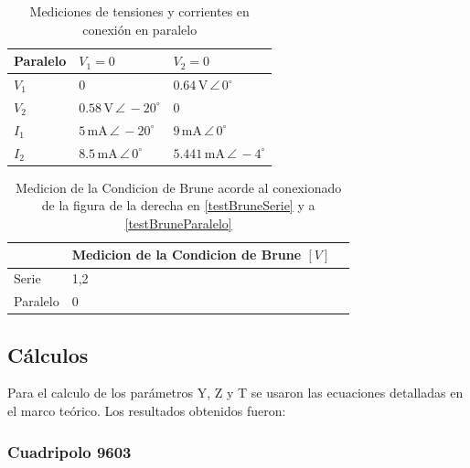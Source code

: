 \begin{table}[H]
\centering
\begin{tabular}{|l|l|l|}
\hline
\textbf{Paralelo} & $V_1 = 0$ & $V_2 = 0$ \\ \hline
$V_1$ & $0$ & $0.64\,\mathrm{V}\,\angle\,0^\circ$ \\ \hline
$V_2$ & $0.58\,\mathrm{V}\,\angle\,-20^\circ$ & $0$ \\ \hline
$I_1$ & $5\,\mathrm{mA}\,\angle\,-20^\circ$ & $9\,\mathrm{mA}\,\angle\,0^\circ$ \\ \hline
$I_2$ & $8.5\,\mathrm{mA}\,\angle\,0^\circ$ & $5.441\,\mathrm{mA}\,\angle\,-4^\circ$ \\ \hline
\end{tabular}
\caption{Mediciones de tensiones y corrientes en conexión en paralelo}
\label{tab:corrientes_tensiones_paralelo}
\end{table}



\begin{table}[H]
\centering
\begin{tabular}{|l|l|l|}
\hline
               & Medicion de la Condicion de Brune $[V]$\\ \hline
  Serie        & 1,2 \\ \hline
  Paralelo     & 0   \\ \hline
\end{tabular}
\caption{Medicion de la Condicion de Brune acorde al conexionado de la figura de la derecha en \ref{testBruneSerie} y a \ref{testBruneParalelo} }
\label{tab:medicionesTestBrune}
\end{table}


     
    \subsection{Cálculos}

	Para el calculo de los parámetros Y, Z y T se usaron las ecuaciones detalladas en el marco teórico. Los resultados obtenidos fueron:
	
	\subsubsection{Cuadripolo 9603}
	
